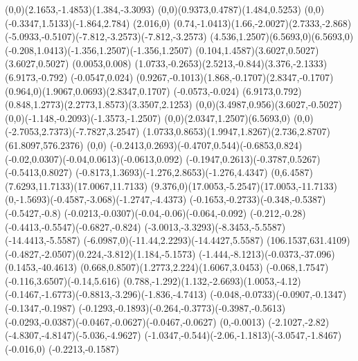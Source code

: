{    \rcurveto(0,0)(2.1653,-1.4853)(1.384,-3.3093)
    \rcurveto(0,0)(0.9373,0.4787)(1.484,0.5253)
    \rcurveto(0,0)(-0.3347,1.5133)(-1.864,2.784)
    \rlineto(2.016,0)
    \rcurveto(0.74,-1.0413)(1.66,-2.0027)(2.7333,-2.868)
    \rcurveto(-5.0933,-0.5107)(-7.812,-3.2573)(-7.812,-3.2573)
    \rcurveto(4.536,1.2507)(6.5693,0)(6.5693,0)
    \rcurveto(-0.208,1.0413)(-1.356,1.2507)(-1.356,1.2507)
    \rcurveto(0.104,1.4587)(3.6027,0.5027)(3.6027,0.5027)
    \rlineto(0.0053,0.008)
    \rcurveto(1.0733,-0.2653)(2.5213,-0.844)(3.376,-2.1333)
    \rlineto(6.9173,-0.792)
    \rlineto(-0.0547,0.024)
    \rcurveto(0.9267,-0.1013)(1.868,-0.1707)(2.8347,-0.1707)
    \rcurveto(0.964,0)(1.9067,0.0693)(2.8347,0.1707)
    \rlineto(-0.0573,-0.024)
    \rlineto(6.9173,0.792)
    \rcurveto(0.848,1.2773)(2.2773,1.8573)(3.3507,2.1253)
    \rcurveto(0,0)(3.4987,0.956)(3.6027,-0.5027)
    \rcurveto(0,0)(-1.148,-0.2093)(-1.3573,-1.2507)
    \rcurveto(0,0)(2.0347,1.2507)(6.5693,0)
    \rcurveto(0,0)(-2.7053,2.7373)(-7.7827,3.2547)
    \rcurveto(1.0733,0.8653)(1.9947,1.8267)(2.736,2.8707)
    \moveto(61.8097,576.2376)
    \rlineto(0,0)
    \rcurveto(-0.2413,0.2693)(-0.4707,0.544)(-0.6853,0.824)
    \rcurveto(-0.02,0.0307)(-0.04,0.0613)(-0.0613,0.092)
    \rcurveto(-0.1947,0.2613)(-0.3787,0.5267)(-0.5413,0.8027)
    \rcurveto(-0.8173,1.3693)(-1.276,2.8653)(-1.276,4.4347)
    \rcurveto(0,6.4587)(7.6293,11.7133)(17.0067,11.7133)
    \rcurveto(9.376,0)(17.0053,-5.2547)(17.0053,-11.7133)
    \rcurveto(0,-1.5693)(-0.4587,-3.068)(-1.2747,-4.4373)
    \rcurveto(-0.1653,-0.2733)(-0.348,-0.5387)(-0.5427,-0.8)
    \rcurveto(-0.0213,-0.0307)(-0.04,-0.06)(-0.064,-0.092)
    \rcurveto(-0.212,-0.28)(-0.4413,-0.5547)(-0.6827,-0.824)
    \rcurveto(-3.0013,-3.3293)(-8.3453,-5.5587)(-14.4413,-5.5587)
    \rcurveto(-6.0987,0)(-11.44,2.2293)(-14.4427,5.5587)
    \moveto(106.1537,631.4109)
    \rcurveto(-0.4827,-2.0507)(0.224,-3.812)(1.184,-5.1573)
    \rcurveto(-1.444,-8.1213)(-0.0373,-37.096)(0.1453,-40.4613)
    \rcurveto(0.668,0.8507)(1.2773,2.224)(1.6067,3.0453)
    \rcurveto(-0.068,1.7547)(-0.116,3.6507)(-0.14,5.616)
    \rcurveto(0.788,-1.292)(1.132,-2.6693)(1.0053,-4.12)
    \rcurveto(-0.1467,-1.6773)(-0.8813,-3.296)(-1.836,-4.7413)
    \rcurveto(-0.048,-0.0733)(-0.0907,-0.1347)(-0.1347,-0.1987)
    \rcurveto(-0.1293,-0.1893)(-0.264,-0.3773)(-0.3987,-0.5613)
    \rcurveto(-0.0293,-0.0387)(-0.0467,-0.0627)(-0.0467,-0.0627)
    \rlineto(0,-0.0013)
    \rcurveto(-2.1027,-2.82)(-4.8307,-4.8147)(-5.036,-4.9627)
    \rcurveto(-1.0347,-0.544)(-2.06,-1.1813)(-3.0547,-1.8467)
    \rlineto(-0.016,0)
    \rlineto(-0.2213,-0.1587)
}
